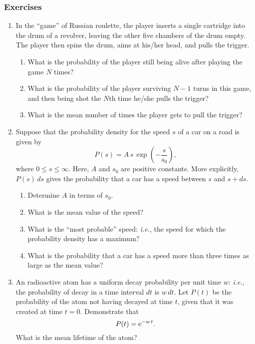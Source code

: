 \subsubsection*{Exercises}
{\small
\begin{enumerate}
\item In the ``game'' of Russian roulette, the player inserts a single cartridge into the drum
of a revolver, leaving the other five chambers of the drum empty. The player then spins
the drum, aims at his/her head, and pulls the trigger.
\begin{enumerate}
\item What is the probability of the player still being alive after playing the game $N$ times?
\item What is the probability of the player surviving $N-1$ turns in this game, and then being
shot the $N$th time he/she pulls the trigger?
\item What is the mean number of times the player gets to pull the trigger?
\end{enumerate}

\item Suppose that the probability density for the speed $s$ of a car on a road
is given by
$$
P(s) = A\,s\,\exp\left(-\frac{s}{s_0}\right),
$$
where $0\leq s\leq \infty$. Here, $A$ and $s_0$ are positive constants. More
explicitly, $P(s)\,ds$ gives the probability that a car has a speed
between $s$ and $s+ds$.
\begin{enumerate}
\item Determine $A$ in terms of $s_0$.
\item What is the mean value of the speed?
\item What is the ``most probable'' speed: {\em i.e.}, the speed
for  which the probability density has a maximum? 
\item What is the probability that a car has a speed more than three times as large
as the mean value?
\end{enumerate}

\item An radioactive atom has a uniform decay probability  per unit time $w$:
{\em i.e.}, the probability of decay in a time interval $dt$ is $w\,dt$. 
Let $P(t)$ be the probability of the atom not having decayed at time $t$,
given that it was created  at time $t=0$. Demonstrate that
$$
P(t) = {\rm e}^{-w\,t}.
$$
What is the mean lifetime of the atom?

\end{enumerate}
}